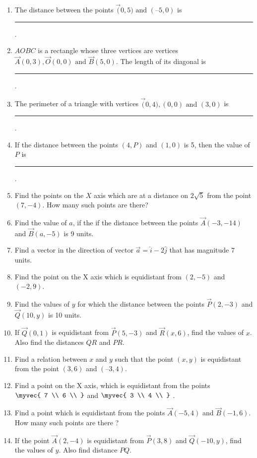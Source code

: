 \begin{enumerate}[label=\thesubsection.\arabic*, ref=\thesubsection.\theenumi]
\item The distance between the points $\vec(0,  5)\text{ and }(–5,  0)$ is \rule{1cm}{0.1pt}.
\item $AOBC$ is a rectangle whose three vertices are vertices $\vec{A} (0,  3),  \vec{O}(0,  0)\text{ and }
	\vec{B} (5,  0)$. The length of its diagonal is \rule{1cm}{0.1pt}.
\item The perimeter of a triangle with vertices $\vec(0,  4),  (0,  0) \text{ and } (3,  0)$ is \rule{1cm}{0.1pt}.
\item If the distance between the points $(4, P)$  and $ (1, 0)$ is 5, then the value of $P$ is \rule{1cm}{0.1pt}.
\item Find the points on the $X$ axis which are at a distance on $2\sqrt{5}$ from the point $ (7, -4).$ How many such points are there?
\item Find the value of $a$,  if the if the distance between the points $\vec{A}(-3, -14)$  and $\vec{B}(a, -5)$ is 9 units.
\item Find a vector in the direction of vector $\overrightarrow{a}=\hat{i} -2\hat{j}$ that has magnitude $7$ units.
\item Find the point on the X axis which is equidistant from $(2, -5)$ and $(-2, 9)$.
	\label{it:10/7/1/7}
	\\
\solution
		
\item Find the values of $y$ for which the distance between the points                  $\vec{P}(2, -3)$ and $\vec{Q}(10, y)$ is 10 units.
\item  If $\vec{Q}(0,  1)$ is equidistant from $\vec{P}(5,  -3)$ and $\vec{R}(x,  6)$,  find the values of $x$. Also find the
distances $QR$ and $PR$.
\item  Find a relation between $x$ and $y$ such that the point $(x, y)$ is equidistant from the point
$(3,  6)$ and $(– 3,  4)$.
	\item Find a point on the X axis, which is equidistant from the points $\myvec{
  7 \\
  6 \\
 }$ and $\myvec{
  3 \\
  4 \\
 }$
.
\label{chapters/11/10/1/4}
%
\item Find a point which is equidistant from the points $\vec{A}(-5, 4)$  and $\vec{B}(-1, 6)$.  How many such points are there ?
\item If the point $\vec{A}(2, -4)$ is equidistant from $\vec{P}(3, 8)$  and $\vec{Q}(-10, y)$,  find the values of $y$.  Also find distance $PQ$.

\end{enumerate}
